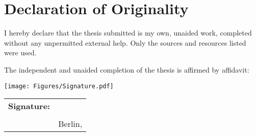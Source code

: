 \chapter*{Declaration of Originality}
I hereby declare that the thesis submitted is my own, unaided work, completed without any unpermitted external help. Only the sources and resources listed were used.

The independent and unaided completion of the thesis is affirmed by affidavit:

\vspace*{1cm}
\hspace*{3.2cm} \texttt{[image: Figures/Signature.pdf]}
\vspace*{-1cm}

\begin{tabular}{@{}p{2cm}p{8cm}@{}}
	\textbf{Signature:} & \hrulefill \\
	& \thesisauthor \\
	& Berlin, \submissiondate \\
\end{tabular}
